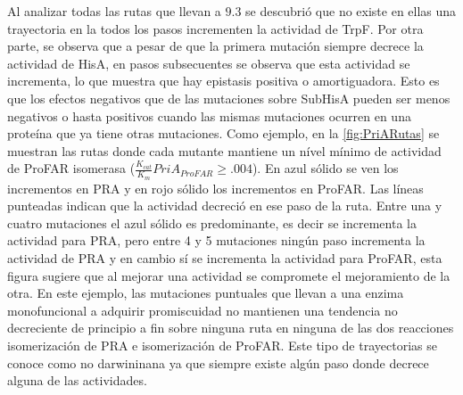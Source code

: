 \documentclass[12pt,twoside]{reedthesis}
\begin{document}
  Al analizar todas las rutas que llevan a \(9.3\) se descubrió que no
  existe en ellas una trayectoria en la todos los pasos incrementen la
  actividad de TrpF. Por otra parte, se observa que a pesar de que la
  primera mutación siempre decrece la actividad de HisA, en pasos
  subsecuentes se observa que esta actividad se incrementa, lo que muestra
  que hay epistasis positiva o amortiguadora. Esto es que los efectos
  negativos que de las mutaciones sobre SubHisA pueden ser menos negativos
  o hasta positivos cuando las mismas mutaciones ocurren en una proteína
  que ya tiene otras mutaciones. Como ejemplo, en la
  \autoref{fig:PriARutas} se muestran las rutas donde cada mutante
  mantiene un nível mínimo de actividad de ProFAR isomerasa
  (\(\frac{K_{cat}}{K_m} PriA_{ProFAR} \ge .004\)). En azul sólido se ven
  los incrementos en PRA y en rojo sólido los incrementos en ProFAR. Las
  líneas punteadas indican que la actividad decreció en ese paso de la
  ruta. Entre una y cuatro mutaciones el azul sólido es predominante, es
  decir se incrementa la actividad para PRA, pero entre 4 y 5 mutaciones
  ningún paso incrementa la actividad de PRA y en cambio sí se incrementa
  la actividad para ProFAR, esta figura sugiere que al mejorar una
  actividad se compromete el mejoramiento de la otra. En este ejemplo, las
  mutaciones puntuales que llevan a una enzima monofuncional a adquirir
  promiscuidad no mantienen una tendencia no decreciente de principio a
  fin sobre ninguna ruta en ninguna de las dos reacciones isomerización de
  PRA e isomerización de ProFAR. Este tipo de trayectorias se conoce como
  no darwininana ya que siempre existe algún paso donde decrece alguna de
  las actividades.
  
\end{document}
